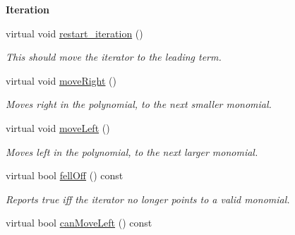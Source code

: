 \begin{Indent}\textbf{ Iteration}\par
\begin{DoxyCompactItemize}
\item 
\mbox{\label{class_d_b___polynomial___iterator_a9be51b376b418c5660ba13fb4a4999cb}} 
virtual void \hyperlink{class_d_b___polynomial___iterator_a9be51b376b418c5660ba13fb4a4999cb}{restart\+\_\+iteration} ()
\begin{DoxyCompactList}\small\item\em This should move the iterator to the leading term. \end{DoxyCompactList}\item 
\mbox{\label{class_d_b___polynomial___iterator_a5d3ad41f6fb9706505ce1171c250b63a}} 
virtual void \hyperlink{class_d_b___polynomial___iterator_a5d3ad41f6fb9706505ce1171c250b63a}{move\+Right} ()
\begin{DoxyCompactList}\small\item\em Moves right in the polynomial, to the next smaller monomial. \end{DoxyCompactList}\item 
\mbox{\label{class_d_b___polynomial___iterator_af083378e827c8882b89583a02aa04531}} 
virtual void \hyperlink{class_d_b___polynomial___iterator_af083378e827c8882b89583a02aa04531}{move\+Left} ()
\begin{DoxyCompactList}\small\item\em Moves left in the polynomial, to the next larger monomial. \end{DoxyCompactList}\item 
virtual bool \hyperlink{class_d_b___polynomial___iterator_a5d81456e74a757cf6769ce17d37b82ce}{fell\+Off} () const
\begin{DoxyCompactList}\small\item\em Reports true iff the iterator no longer points to a valid monomial. \end{DoxyCompactList}\item 
\mbox{\label{class_d_b___polynomial___iterator_af2ec7bc827d965631b3fbd9ff0f8a938}} 
virtual bool \hyperlink{class_d_b___polynomial___iterator_af2ec7bc827d965631b3fbd9ff0f8a938}{can\+Move\+Left} () const

\end{DoxyCompactItemize}
\end{Indent}
